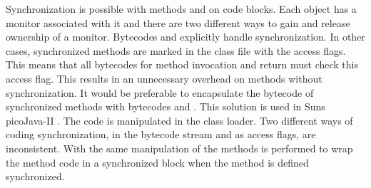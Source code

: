 Synchronization is possible with methods and on code blocks. Each
object has a monitor associated with it and there are two different
ways to gain and release ownership of a monitor. Bytecodes
 and  explicitly handle
synchronization. In other cases, synchronized methods are marked in
the class file with the access flags. This means that all bytecodes
for method invocation and return must check this access flag. This
results in an unnecessary overhead on methods without
synchronization. It would be preferable to encapsulate the bytecode
of synchronized methods with bytecodes  and
. This solution is used in Suns picoJava-II
\cite{pjProgRef}. The code is manipulated in the class loader. Two
different ways of coding synchronization, in the bytecode stream and
as access flags, are inconsistent. With  the same
manipulation of the methods is performed to wrap the method code in a
synchronized block when the method is defined synchronized.
